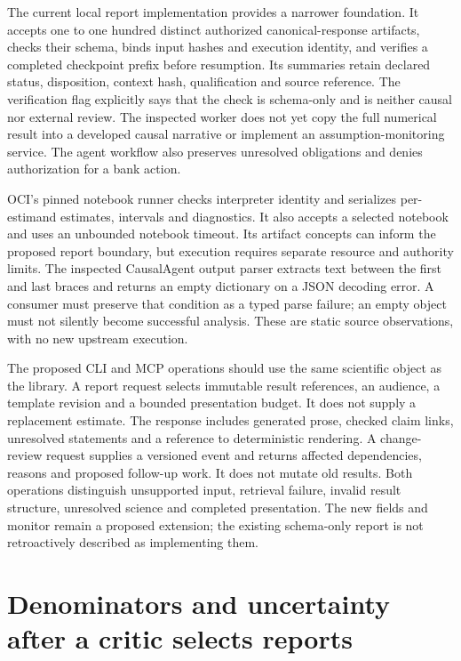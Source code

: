 The current local report implementation provides a narrower foundation. It
accepts one to one hundred distinct authorized canonical-response artifacts,
checks their schema, binds input hashes and execution identity, and verifies a
completed checkpoint prefix before resumption. Its summaries retain declared
status, disposition, context hash, qualification and source reference. The
verification flag explicitly says that the check is schema-only and is neither
causal nor external review. The inspected worker does not yet copy the full
numerical result into a developed causal narrative or implement an
assumption-monitoring service. The agent workflow also preserves unresolved
obligations and denies authorization for a bank action.
\citep{exec16_report_sources,exec14_custody_implementation,exec14_failure_implementation}

OCI's pinned notebook runner checks interpreter identity and serializes
per-estimand estimates, intervals and diagnostics. It also accepts a selected
notebook and uses an unbounded notebook timeout. Its artifact concepts can
inform the proposed report boundary, but execution requires separate resource
and authority limits. The inspected CausalAgent output parser extracts text
between the first and last braces and returns an empty dictionary on a JSON
decoding error. A consumer must preserve that condition as a typed parse
failure; an empty object must not silently become successful analysis.
These are static source observations, with no new upstream execution.
\citep{v12_la_package_oci_agent,v12_la_package_causalagent,exec16_report_sources}

The proposed CLI and MCP operations should use the same scientific object as
the library. A report request selects immutable result references, an audience,
a template revision and a bounded presentation budget. It does not supply a
replacement estimate. The response includes generated prose, checked claim
links, unresolved statements and a reference to deterministic rendering.
A change-review request supplies a versioned event and returns affected
dependencies, reasons and proposed follow-up work. It does not mutate old
results. Both operations distinguish unsupported input, retrieval failure,
invalid result structure, unresolved science and completed presentation.
The new fields and monitor remain a proposed extension; the existing
schema-only report is not retroactively described as implementing them.

\section{Denominators and uncertainty after a critic selects reports}

